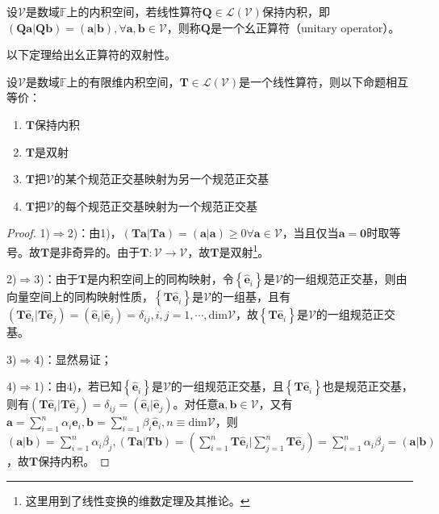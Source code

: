 \documentclass[main.tex]{subfiles}
\begin{document}
\begin{definition}[幺正算符]\label{def:II.6.2}
    设$\mathcal{V}$是数域$\mathbb{F}$上的内积空间，若线性算符$\mathbf{Q}\in\mathcal{L}\left(\mathcal{V}\right)$保持内积，即$\left(\mathbf{Qa}|\mathbf{Qb}\right)=\left(\mathbf{a}|\mathbf{b}\right),\forall\mathbf{a},\mathbf{b}\in\mathcal{V}$，则称$\mathbf{Q}$是一个幺正算符（unitary operator）。
\end{definition}

以下定理给出幺正算符的双射性。

\begin{theorem}\label{thm:II.6.3}
    设$\mathcal{V}$是数域$\mathbb{F}$上的有限维内积空间，$\mathbf{T}\in\mathcal{L}\left(\mathcal{V}\right)$是一个线性算符，则以下命题相互等价：
    \begin{enumerate}
        \item $\mathbf{T}$保持内积
        \item $\mathbf{T}$是双射
        \item $\mathbf{T}$把$\mathcal{V}$的某个规范正交基映射为另一个规范正交基
        \item $\mathbf{T}$把$\mathcal{V}$的每个规范正交基映射为一个规范正交基
    \end{enumerate}
\end{theorem}
\begin{proof}
    1)$\Rightarrow$2)：由1)，$\left(\mathbf{Ta}|\mathbf{Ta}\right)=\left(\mathbf{a}|\mathbf{a}\right)\geq0\forall\mathbf{a}\in\mathcal{V}$，当且仅当$\mathbf{a}=\mathbf{0}$时取等号。故$\mathbf{T}$是非奇异的。由于$\mathbf{T}:\mathcal{V}\rightarrow\mathcal{V}$，故$\mathbf{T}$是双射\footnote{这里用到了线性变换的维数定理及其推论。}。

    2)$\Rightarrow$3)：由于$\mathbf{T}$是内积空间上的同构映射，令$\left\{\mathbf{\hat{e}}_i\right\}$是$\mathcal{V}$的一组规范正交基，则由向量空间上的同构映射性质，$\left\{\mathbf{T\hat{e}}_i\right\}$是$\mathcal{V}$的一组基，且有$\left(\mathbf{T\hat{e}}_i|\mathbf{T\hat{e}}_j\right)=\left(\mathbf{\hat{e}}_i|\mathbf{\hat{e}}_j\right)=\delta_{ij},i,j=1,\cdots,\mathrm{dim}\mathcal{V}$，故$\left\{\mathbf{T\hat{e}}_i\right\}$是$\mathcal{V}$的一组规范正交基。

    3)$\Rightarrow$4)：显然易证；

    4)$\Rightarrow$1)：由4)，若已知$\left\{\mathbf{\hat{e}}_i\right\}$是$\mathcal{V}$的一组规范正交基，且$\left\{\mathbf{T\hat{e}}_i\right\}$也是规范正交基，则有$\left(\mathbf{T\hat{e}}_i|\mathbf{T\hat{e}}_j\right)=\delta_{ij}=\left(\mathbf{\hat{e}}_i|\mathbf{\hat{e}}_j\right)$。对任意$\mathbf{a},\mathbf{b}\in\mathcal{V}$，又有$\mathbf{a}=\sum_{i=1}^{n}\alpha_i\mathbf{\hat{e}}_i,\mathbf{b}=\sum_{i=1}^{n}\beta_i\mathbf{\hat{e}}_i,n\equiv\mathrm{dim}\mathcal{V}$，则$\left(\mathbf{a}|\mathbf{b}\right)=\sum_{i=1}^n\alpha_i\overline{\beta_j},\left(\mathbf{Ta}|\mathbf{Tb}\right)=\left(\sum_{i=1}^n\mathbf{T\hat{e}}_i|\sum_{j=1}^n\mathbf{T\hat{e}}_j\right)=\sum_{i=1}^n\alpha_i\overline{\beta_j}=\left(\mathbf{a}|\mathbf{b}\right)$，故$\mathbf{T}$保持内积。
\end{proof}
\end{document}
